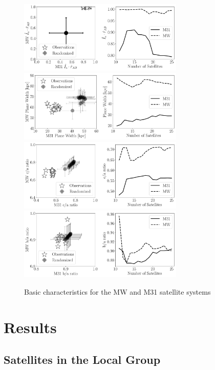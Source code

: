 \documentclass[a4paper,fleqn,usenatbib]{mnras}
\begin{document}
\begin{figure}
\centering
\includegraphics[width=0.7\textwidth]{mu_lg.pdf}
\includegraphics[width=0.7\textwidth]{planewidth_lg.pdf}
\includegraphics[width=0.7\textwidth]{ca_ratio_lg.pdf}
\includegraphics[width=0.7\textwidth]{ba_ratio_lg.pdf}
\caption{Basic characteristics for the MW and M31 satellite systems
\label{fig:general}}
\end{figure}



\section{Results}
\label{sec:results}

\subsection{Satellites in the Local Group}
\end{document}
